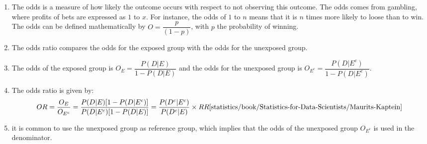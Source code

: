 \begin{enumerate}
    \item
    \begin{definition}[Odds]
        The odds is a measure of how likely the outcome occurs with respect to not observing this outcome.
        The odds comes from gambling, where profits of bets are expressed as $1$ to $x$.
        For instance, the odds of $1$ to $n$ means that it is $n$ times more likely to loose than to win.
        The odds can be defined mathematically by $O = \dfrac{p}{(1 - p)}$, with $p$ the probability of winning.
        \hfill \cite{statistics/book/Statistics-for-Data-Scientists/Maurits-Kaptein}
    \end{definition}

    \item The odds ratio compares the odds for the exposed group with the odds for the unexposed group.
    \hfill \cite{statistics/book/Statistics-for-Data-Scientists/Maurits-Kaptein}

    \item The odds of the exposed group is $O_E = \dfrac{P (D|E)}{1 - P (D|E)}$ and the odds for the unexposed group is $O_{E^c} = \dfrac{P (D|E^c)}{1 - P (D|E^c)}$.
    \hfill \cite{statistics/book/Statistics-for-Data-Scientists/Maurits-Kaptein}

    \item The odds ratio is given by:
    \[
        OR
        = \dfrac{O_E}{O_{E^c}}
        = \dfrac{P (D|E)[1 - P (D|E^c)]}{P (D|E^c)[1 - P (D|E)] }
        = \dfrac{P (D^c|E^c)}{P (D^c|E)} \times RR
        \hfill \text{\cite{statistics/book/Statistics-for-Data-Scientists/Maurits-Kaptein}}
    \]

    \item  it is common to use the unexposed group as reference group, which implies that the odds of the unexposed group $O_{E^c}$ is used in the denominator.
\end{enumerate}


